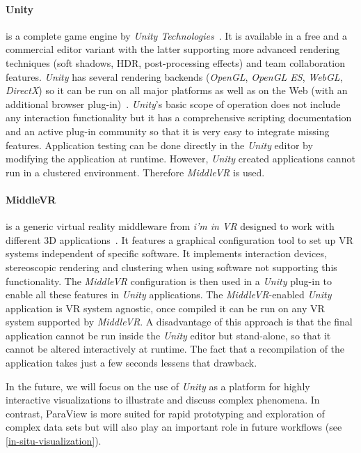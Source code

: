 \documentclass[twocolumn]{svjour3}          %
\begin{document}
\paragraph{Unity}
is a complete game engine by \emph{Unity Technologies}~\cite{goldstone:unity3d}. It is available in a free and a commercial editor variant with the latter supporting more advanced rendering techniques (soft shadows, HDR, post-processing effects) and team collaboration features. \emph{Unity} has several rendering backends (\emph{OpenGL}, \emph{OpenGL ES}, \emph{Web\-GL}, \emph{DirectX}) so it can be run on all major platforms as well as on the Web (with an additional browser plug-in)~\cite{web:unity}. \emph{Unity}'s basic scope of operation does not include any interaction functionality but it has a comprehensive scripting documentation and an active plug-in community so that it is very easy to integrate missing features. Application testing can be done directly in the \emph{Unity} editor by modifying the application at runtime. However, \emph{Unity} created applications cannot run in a clustered environment. Therefore \emph{MiddleVR} is used.

\paragraph{MiddleVR}
is a generic virtual reality middleware from \emph{i'm in VR} designed to work with different 3D applications~\cite{web:middlevr}. It features a graphical configuration tool to set up VR systems independent of specific software. It implements interaction devices, stereoscopic rendering and clustering when using software not supporting this functionality. The \emph{MiddleVR} configuration is then used in a \emph{Unity} plug-in to enable all these features in \emph{Unity} applications. The \emph{MiddleVR}-enabled \emph{Unity} application is VR system agnostic, once compiled it can be run on any VR system supported by \emph{MiddleVR}. A disadvantage of this approach is that the final application cannot be run inside the \emph{Unity} editor but stand-alone, so that it cannot be altered interactively at runtime. The fact that a recompilation of the application takes just a few seconds lessens that drawback.

In the future, we will focus on the use of \emph{Unity} as a platform for highly interactive visualizations to illustrate and discuss complex phenomena. In contrast, ParaView is more suited for rapid prototyping and exploration of complex data sets but will also play an important role in future workflows (see \ref{in-situ-visualization}).
\end{document}
